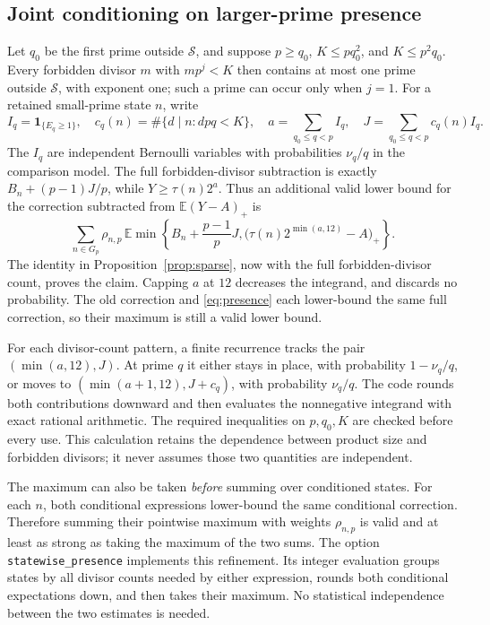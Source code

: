 \documentclass[11pt]{article}
\newcommand{\E}{\mathbb E}
\begin{document}
\subsection{Joint conditioning on larger-prime presence}\label{sec:presence}
Let $q_0$ be the first prime outside $\mathcal S$, and suppose $p\geq q_0$,
$K\leq pq_0^2$, and $K\leq p^2q_0$. Every forbidden divisor $m$ with
$mp^j<K$ then contains at most one prime outside $\mathcal S$, with
exponent one; such a prime can occur only when $j=1$.
For a retained small-prime state $n$, write
\[
 I_q=\mathbf1_{\{E_q\geq1\}},\quad
 c_q(n)=\#\{d\mid n:dpq<K\},\quad
 a=\sum_{q_0\leq q<p}I_q,\quad J=\sum_{q_0\leq q<p}c_q(n)I_q.
\]
The $I_q$ are independent Bernoulli variables with probabilities
$\nu_q/q$ in the comparison model. The full forbidden-divisor subtraction
is exactly $B_n+(p-1)J/p$, while
$Y\geq\tau(n)2^a$. Thus an additional valid lower bound for the correction
subtracted from $\E(Y-A)_+$ is
\begin{equation}\label{eq:presence}
 \sum_{n\in G_p}\rho_{n,p}\,
 \E\min\left\{B_n+\frac{p-1}{p}J,
       \big(\tau(n)2^{\min(a,12)}-A\big)_+\right\}.
\end{equation}
The identity in Proposition~\ref{prop:sparse}, now with the full
forbidden-divisor count, proves the claim. Capping $a$ at $12$ decreases
the integrand, and discards no probability. The old correction and
\eqref{eq:presence} each lower-bound the same full correction, so their
maximum is still a valid lower bound.

For each divisor-count pattern, a finite recurrence tracks the pair
$(\min(a,12),J)$. At prime $q$ it either stays in place, with probability
$1-\nu_q/q$, or moves to $(\min(a+1,12),J+c_q)$, with probability
$\nu_q/q$. The code rounds both contributions downward and then evaluates
the nonnegative integrand with exact rational arithmetic. The required
inequalities on $p,q_0,K$ are checked before every use. This calculation
retains the dependence between product size and forbidden divisors;
it never assumes those two quantities are independent.

The maximum can also be taken \emph{before} summing over conditioned states.
For each $n$, both conditional expressions lower-bound the same conditional
correction. Therefore summing their pointwise maximum with weights
$\rho_{n,p}$ is valid and at least as strong as taking the maximum of the
two sums. The option \texttt{statewise\_presence} implements this refinement.
Its integer evaluation groups states by all divisor counts needed by either
expression, rounds both conditional expectations down, and then takes their
maximum. No statistical independence between the two estimates is needed.
\end{document}
